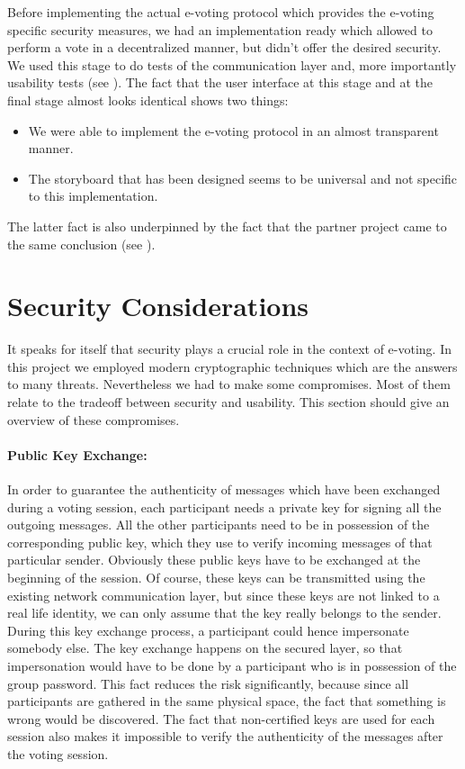 \documentclass[numbers=noenddot, abstract=on, a4paper, headsepline,
footsepline, oneside, openright, draft=off, listof=leveldown]{scrreprt}
\newcommand{\myref}[1]{(see \Vref{#1})}
\begin{document}
Before implementing the actual e-voting protocol which provides the e-voting
specific security measures, we had an implementation ready which allowed to
perform a vote in a decentralized manner, but didn't offer the desired
security. We used this stage to do tests of the communication layer and, more
importantly usability tests \myref{sec:usabilitytests}. The fact that the user
interface at this stage and at the final stage almost looks identical shows two
things:
\begin{itemize}
  \item We were able to implement the e-voting protocol in an almost transparent
  manner. 
  \item The storyboard that has been designed seems to be universal and not
  specific to this implementation.
\end{itemize}
The latter fact is also underpinned by the fact that the partner project came to
the same conclusion \myref{sec:comparisontopartnerproject}.

\section{Security Considerations}
It speaks for itself that security plays a crucial role in the context of
e-voting. In this project we employed modern cryptographic techniques which are
the answers to many threats. Nevertheless we had to make some compromises. Most
of them relate to the tradeoff between security and usability. This section
should give an overview of these compromises.

\paragraph{Public Key Exchange:} In order to guarantee the authenticity of
messages which have been exchanged during a voting session, each participant
needs a private key for signing all the outgoing messages. All the other
participants need to be in possession of the corresponding public key, which
they use to verify incoming messages of that particular sender. Obviously these
public keys have to be exchanged at the beginning of the session. Of course,
these keys can be transmitted using the existing network communication layer,
but since these keys are not linked to a real life identity, we can only assume
that the key really belongs to the sender. During this key exchange process, a
participant could hence impersonate somebody else. The key exchange happens on
the secured layer, so that impersonation would have to be done by a participant
who is in possession of the group password. This fact reduces the risk
significantly, because since all participants are gathered in the same physical
space, the fact that something is wrong would be discovered. The fact that
non-certified keys are used for each session also makes it impossible to verify
the authenticity of the messages after the voting session.
\end{document}
